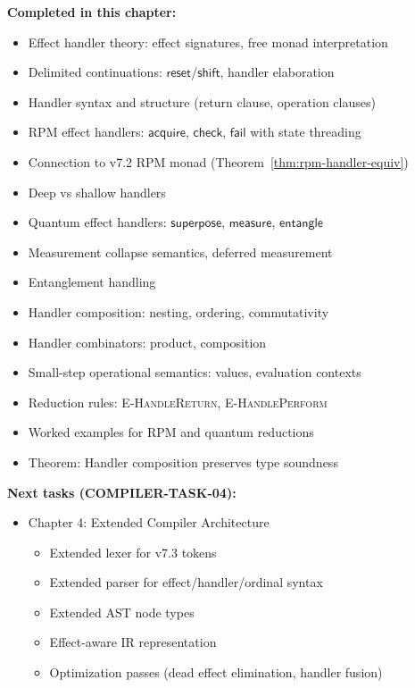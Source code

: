 \begin{tcolorbox}[colback=green!5!white,colframe=green!50!black,title=\textbf{Handoff: COMPILER-TASK-03 Complete},breakable]
\textbf{Completed in this chapter:}
\begin{itemize}
  \item Effect handler theory: effect signatures, free monad interpretation
  \item Delimited continuations: $\mathsf{reset}$/$\mathsf{shift}$, handler elaboration
  \item Handler syntax and structure (return clause, operation clauses)
  \item RPM effect handlers: $\mathsf{acquire}$, $\mathsf{check}$, $\mathsf{fail}$ with state threading
  \item Connection to v7.2 RPM monad (Theorem~\ref{thm:rpm-handler-equiv})
  \item Deep vs shallow handlers
  \item Quantum effect handlers: $\mathsf{superpose}$, $\mathsf{measure}$, $\mathsf{entangle}$
  \item Measurement collapse semantics, deferred measurement
  \item Entanglement handling
  \item Handler composition: nesting, ordering, commutativity
  \item Handler combinators: product, composition
  \item Small-step operational semantics: values, evaluation contexts
  \item Reduction rules: \textsc{E-HandleReturn}, \textsc{E-HandlePerform}
  \item Worked examples for RPM and quantum reductions
  \item Theorem: Handler composition preserves type soundness
\end{itemize}

\textbf{Next tasks (COMPILER-TASK-04):}
\begin{itemize}
  \item Chapter 4: Extended Compiler Architecture
    \begin{itemize}
      \item Extended lexer for v7.3 tokens
      \item Extended parser for effect/handler/ordinal syntax
      \item Extended AST node types
      \item Effect-aware IR representation
      \item Optimization passes (dead effect elimination, handler fusion)
    \end{itemize}
\end{itemize}
\end{tcolorbox}

